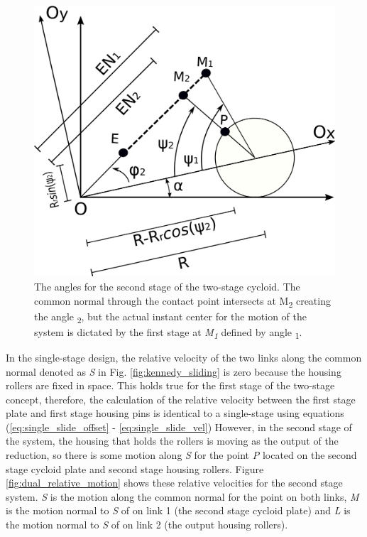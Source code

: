 \begin{figure}[t]
	\centering
	\includegraphics[width=0.50\linewidth]{fig/two_stage_angles}
   \caption{The angles for the second stage of the two-stage cycloid. The common normal through the contact point intersects at M\textsubscript{2} creating the angle \textpsi\textsubscript{2}, but the actual instant center for the motion of the system is dictated by the first stage at \textit{M\textsubscript{1}} defined by angle \textpsi\textsubscript{1}.}
   \label{fig:two_stage_angles}
\end{figure}


In the single-stage design, the relative velocity of the two links along the common normal denoted as \textit{S} in Fig. \ref{fig:kennedy_sliding} is zero because the housing rollers are fixed in space. This holds true for the first stage of the two-stage concept, therefore, the calculation of the relative velocity between the first stage plate and first stage housing pins is identical to a single-stage using equations (\ref{eq:single_slide_offset} - \ref{eq:single_slide_vel}) However, in the second stage of the system, the housing that holds the rollers is moving as the output of the reduction, so there is some motion along \textit{S} for the point \textit{P} located on the second stage cycloid plate and second stage housing rollers. Figure \ref{fig:dual_relative_motion} shows these relative velocities for the second stage system. \textit{S} is the motion along the common normal for the point  on both links, \textit{M} is the motion normal to \textit{S} of  on link 1 (the second stage cycloid plate) and \textit{L} is the motion normal to \textit{S} of  on link 2 (the output housing rollers). 


